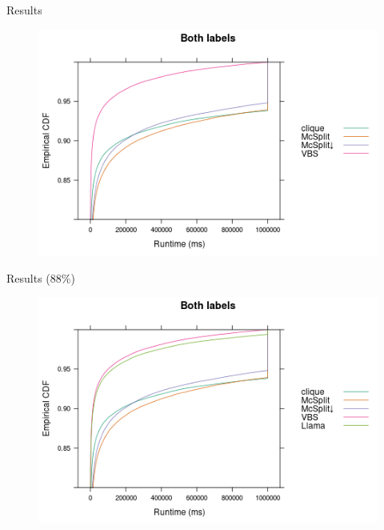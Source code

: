 \documentclass{beamer}
\begin{document}
\begin{frame}{Results}
  \begin{figure}
    \centering
    \includegraphics[width=\textwidth]{../dissertation/images/ecdf_both_labels.png}
  \end{figure}
\end{frame}

\begin{frame}{Results (88\%)}
  \begin{figure}
    \centering
    \includegraphics[width=\textwidth]{../dissertation/images/ecdf_both_labels_llama.png}
  \end{figure}
\end{frame}
\end{document}
